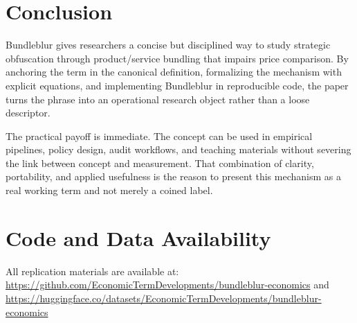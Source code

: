 \documentclass[12pt]{article}
\begin{document}
\section{Conclusion}
Bundleblur gives researchers a concise but disciplined way to study strategic obfuscation through product/service bundling that impairs price comparison. By anchoring the term in the canonical definition, formalizing the mechanism with explicit equations, and implementing Bundleblur in reproducible code, the paper turns the phrase into an operational research object rather than a loose descriptor.

The practical payoff is immediate. The concept can be used in empirical pipelines, policy design, audit workflows, and teaching materials without severing the link between concept and measurement. That combination of clarity, portability, and applied usefulness is the reason to present this mechanism as a real working term and not merely a coined label.

\section*{Code and Data Availability}
All replication materials are available at:
\url{https://github.com/EconomicTermDevelopments/bundleblur-economics} and
\url{https://huggingface.co/datasets/EconomicTermDevelopments/bundleblur-economics}
\end{document}
